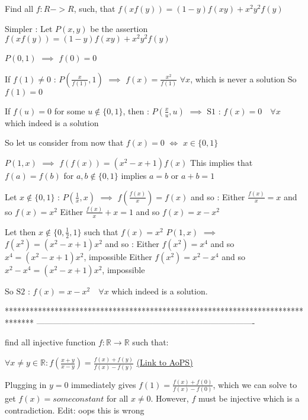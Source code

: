 \begin{solution}
	\begin{tcolorbox}Find all $ f : R -> R$, such, that $ f(xf(y))=(1-y)f(xy)+x^2y^2f(y)$\end{tcolorbox}
Simpler :
Let $P(x,y)$ be the assertion $f(xf(y))=(1-y)f(xy)+x^2y^2f(y)$

$P(0,1)$ $\implies$ $f(0)=0$

If $f(1)\ne 0$ : $P(\frac x{f(1)},1)$ $\implies$ $f(x)=\frac{x^2}{f(1)}$ $\forall x$, which is never a solution
So $f(1)=0$

If $f(u)=0$ for some $u\notin\{0,1\}$, then :
$P(\frac xu,u)$ $\implies$ $\boxed{\text{S1 : }f(x)=0\quad\forall x}$ which indeed is a solution

So let us consider from now that $f(x)=0$ $\iff$ $x\in\{0,1\}$

$P(1,x)$ $\implies$ $f(f(x))=(x^2-x+1)f(x)$
This implies that $f(a)=f(b)$ for $a,b\notin\{0,1\}$ implies $a=b$ or $a+b=1$

Let $x\notin\{0,1\}$ :
$P(\frac 1x,x)$ $\implies$ $f(\frac{f(x)}x)=f(x)$ and so :
Either $\frac{f(x)}x=x$ and so $f(x)=x^2$
Either $\frac{f(x)}x+x=1$ and so $f(x)=x-x^2$

Let then $x\notin\{0,\frac 12,1\}$ such that $f(x)=x^2$
$P(1,x)$ $\implies$ $f(x^2)=(x^2-x+1)x^2$ and so :
Either $f(x^2)=x^4$ and so $x^4=(x^2-x+1)x^2$, impossible
Either $f(x^2)=x^2-x^4$ and so $x^2-x^4=(x^2-x+1)x^2$, impossible

So $\boxed{\text{S2 : }f(x)=x-x^2\quad\forall x}$ which indeed is a solution.
\end{solution}
*******************************************************************************
-------------------------------------------------------------------------------

\begin{problem}
	find all injective function $f : \mathbb R \to \mathbb R $ such that:

 $\forall x\ne y\in\mathbb R :f(\frac{x+y}{x-y})=\frac{f(x)+f(y)}{f(x)-f(y)}$
	\flushright \href{https://artofproblemsolving.com/community/c6h1622408}{(Link to AoPS)}
\end{problem}



\begin{solution}
	Plugging in $y=0$ immediately gives $f(1)=\frac{f(x)+f(0)}{f(x)-f(0)}$, which we can solve to get $f(x)=someconstant$ for all $x \neq 0$. However, $f$ must be injective which is a contradiction.
Edit: oops this is wrong
\end{solution}



